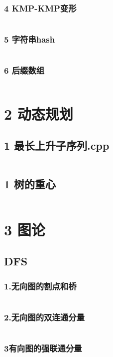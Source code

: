 \documentclass{article}
\begin{document}
\subsubsection{4 KMP-KMP变形}
\inputminted{c++}{/home/zzuzxy/t3/ACM-template/1 数据结构/字符串/4 KMP-KMP变形.cpp}
\subsubsection{5 字符串hash}
\inputminted{c++}{/home/zzuzxy/t3/ACM-template/1 数据结构/字符串/5 字符串hash.cpp}
\subsubsection{6 后缀数组}
\inputminted{c++}{/home/zzuzxy/t3/ACM-template/1 数据结构/字符串/6 后缀数组.cpp}
\section{2 动态规划}
\subsection{1 最长上升子序列.cpp}
\inputminted{c++}{/home/zzuzxy/t3/ACM-template/2 动态规划/1 最长上升子序列.cpp}
\subsection{1 树的重心}
\inputminted{c++}{/home/zzuzxy/t3/ACM-template/2 动态规划/树上的分治/1 树的重心.cpp}
\section{3 图论}
\subsection{DFS}
\subsubsection{1.无向图的割点和桥}
\inputminted{c++}{/home/zzuzxy/t3/ACM-template/3 图论/DFS/1.无向图的割点和桥.cpp}
\subsubsection{2.无向图的双连通分量}
\inputminted{c++}{/home/zzuzxy/t3/ACM-template/3 图论/DFS/2.无向图的双连通分量.cpp}
\subsubsection{3有向图的强联通分量}
\inputminted{c++}{/home/zzuzxy/t3/ACM-template/3 图论/DFS/3有向图的强联通分量.cpp}
\end{document}
